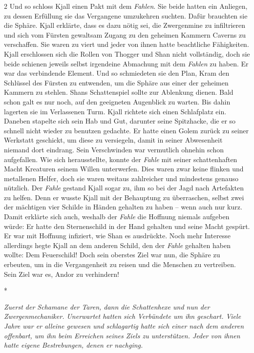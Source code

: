 \documentclass[10pt, a4paper, oneside]{book}
\begin{document}
\begin{multicols}{2}
Und so schloss Kjall einen Pakt mit dem \textit{Fahlen}. Sie beide hatten ein Anliegen, zu dessen Erfüllung sie das Vergangene umzukehren suchten. Dafür brauchten sie die Sphäre. Kjall erklärte, dass es dazu nötig sei, die Zwergenmine zu infiltrieren und sich vom Fürsten gewaltsam Zugang zu den geheimen Kammern Caverns zu verschaffen. Sie waren zu viert und jeder von ihnen hatte beachtliche Fähigkeiten. Kjall erschlossen sich die Rollen von Thogger und Shan nicht vollständig, doch sie beide schienen jeweils selbst irgendeine Abmachung mit dem \textit{Fahlen} zu haben. Er war das verbindende Element. Und so schmiedeten sie den Plan, Kram den Schlüssel des Fürsten zu entwenden, um die Sphäre aus einer der geheimen Kammern zu stehlen. Shans Schattenspiel sollte zur Ablenkung dienen. Bald schon galt es nur noch, auf den geeigneten Augenblick zu warten. Bis dahin lagerten sie im Verlassenen Turm. Kjall richtete sich einen Schlafplatz ein. Daneben stapelte sich sein Hab und Gut, darunter seine Spitzhacke, die er so schnell nicht wieder zu benutzen gedachte. Er hatte einen Golem zurück zu seiner Werkstatt geschickt, um diese zu versiegeln, damit in seiner Abwesenheit niemand dort eindrang. Sein Verschwinden war vermutlich ohnehin schon aufgefallen. Wie sich herausstellte, konnte der \textit{Fahle} mit seiner schattenhaften Macht Kreaturen seinem Willen unterwerfen. Dies waren zwar keine flinken und metallenen Helfer, doch sie waren weitaus zahlreicher und mindestens genauso nützlich. Der \textit{Fahle} gestand Kjall sogar zu, ihm so bei der Jagd nach Artefakten zu helfen. Denn er wusste Kjall mit der Behauptung zu überraschen, selbst zwei der mächtigen vier Schilde in Händen gehalten zu haben – wenn auch nur kurz. Damit erklärte sich auch, weshalb der \textit{Fahle} die Hoffnung niemals aufgeben würde: Er hatte den Sternenschild in der Hand gehalten und seine Macht gespürt. Er war mit Hoffnung infiziert, wie Shan es ausdrückte. Noch mehr Interesse allerdings hegte Kjall an dem anderen Schild, den der \textit{Fahle} gehalten haben wollte: Dem Feuerschild! Doch sein oberstes Ziel war nun, die Sphäre zu erbeuten, um in die Vergangenheit zu reisen und die Menschen zu vertreiben. Sein Ziel war es, Andor zu verhindern!

\begin{center}
    *
\end{center}

\textit{Zuerst der Schamane der Taren, dann die Schattenhexe und nun der Zwergenmechaniker. Unerwartet hatten sich Verbündete um ihn geschart. Viele Jahre war er alleine gewesen und schlagartig hatte sich einer nach dem anderen offenbart, um ihn beim Erreichen seines Ziels zu unterstützen. Jeder von ihnen hatte eigene Bestrebungen, denen er nachging.}\bigskip


\end{multicols}
\end{document}
